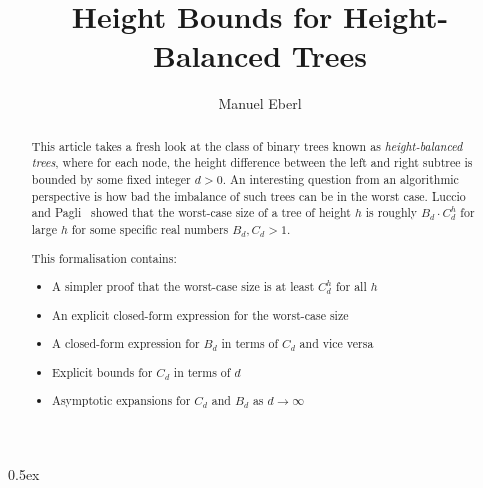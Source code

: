 \documentclass[11pt,a4paper]{article}
\begin{document}
\title{Height Bounds for Height-Balanced Trees}
\author{Manuel Eberl}
\maketitle

\begin{abstract}
This article takes a fresh look at the class of binary trees known as \emph{height-balanced trees}, where for each node, the height difference between the left and right subtree is bounded by some fixed integer $d > 0$. An interesting question from an algorithmic perspective is how bad the imbalance of such trees can be in the worst case. Luccio and Pagli~\cite{luccio} showed that the worst-case size of a tree of height $h$ is roughly $B_d\cdot C_d^h$ for large $h$ for some specific real numbers $B_d, C_d > 1$.

This formalisation contains:
\begin{itemize}
\item A simpler proof that the worst-case size is at least $C_d ^ h$ for all $h$
\item An explicit closed-form expression for the worst-case size
\item A closed-form expression for $B_d$ in terms of $C_d$ and vice versa
\item Explicit bounds for $C_d$ in terms of $d$
\item Asymptotic expansions for $C_d$ and $B_d$ as $d\to\infty$
\end{itemize}
\end{abstract}

\newpage
\tableofcontents
\newpage
\parindent 0pt\parskip 0.5ex



\nocite{luccio}


\end{document}
